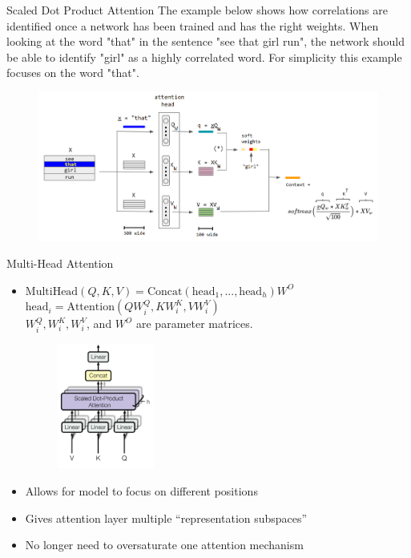 \documentclass[
  notheorems,
  aspectratio=54,
]{beamer}
\begin{document}
\begin{frame}{Scaled Dot Product Attention}
The example below shows how correlations are identified once a network has been trained and has the right weights. When looking at the word "that" in the sentence "see that girl run", the network should be able to identify "girl" as a highly correlated word. For simplicity this example focuses on the word "that".
    \begin{figure}
      \centering
      \includegraphics[width=1\textwidth]{Attention-qkv.png}
    \end{figure}
\end{frame}

\begin{frame}{Multi-Head Attention}
  \begin{itemize}
    \item
    ${\displaystyle {\text{MultiHead}}(Q,K,V)={\text{Concat}}({\text{head}}_{1},...,{\text{head}}_{h})W^{O}}$
    ${\displaystyle {\text{head}}_{i}={\text{Attention}}(QW_{i}^{Q},KW_{i}^{K},VW_{i}^{V})}$
\\  ${\displaystyle W_{i}^{Q},W_{i}^{K},W_{i}^{V}}$, and
    ${\displaystyle W^{O}}$ are parameter matrices.
    \begin{figure}
      \centering
      \includegraphics[width=0.3\textwidth]{multi-head-attention.png}
    \end{figure}
    \item Allows for model to focus on different positions
    \item Gives attention layer multiple “representation subspaces”
    \item No longer need to oversaturate one attention mechanism
  \end{itemize}
\end{frame}
\end{document}
